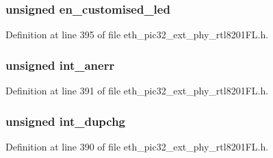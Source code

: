 \subsubsection[{en\+\_\+customised\+\_\+led}]{\setlength{\rightskip}{0pt plus 5cm}unsigned en\+\_\+customised\+\_\+led}\label{union___i_n_t___w_o_l___l_e_d_s__t_ace472d5c667ff6b47aa8b7f2b3248327}


Definition at line 395 of file eth\+\_\+pic32\+\_\+ext\+\_\+phy\+\_\+rtl8201\+F\+L.\+h.

\hypertarget{union___i_n_t___w_o_l___l_e_d_s__t_a2041712ddaa9b91900c0c92652956969}{}
\subsubsection[{int\+\_\+anerr}]{\setlength{\rightskip}{0pt plus 5cm}unsigned int\+\_\+anerr}\label{union___i_n_t___w_o_l___l_e_d_s__t_a2041712ddaa9b91900c0c92652956969}


Definition at line 391 of file eth\+\_\+pic32\+\_\+ext\+\_\+phy\+\_\+rtl8201\+F\+L.\+h.

\hypertarget{union___i_n_t___w_o_l___l_e_d_s__t_aacc515a22fbaaa4b196a0590f61fec03}{}
\subsubsection[{int\+\_\+dupchg}]{\setlength{\rightskip}{0pt plus 5cm}unsigned int\+\_\+dupchg}\label{union___i_n_t___w_o_l___l_e_d_s__t_aacc515a22fbaaa4b196a0590f61fec03}


Definition at line 390 of file eth\+\_\+pic32\+\_\+ext\+\_\+phy\+\_\+rtl8201\+F\+L.\+h.

\hypertarget{union___i_n_t___w_o_l___l_e_d_s__t_a386b3fd5b40085ce0114845fe40bcd75}{}
